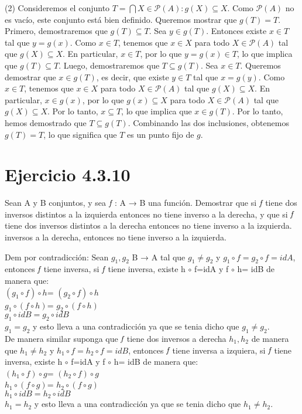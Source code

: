 \documentclass{report}
\begin{document}
        \noindent (2) Consideremos el conjunto $T = \bigcap {X \in \mathcal{P}(A) : g(X) \subseteq X}$. Como $\mathcal{P}(A)$ no es vacío, este conjunto está bien definido.
        Queremos mostrar que $g(T) = T$.
        Primero, demostraremos que $g(T) \subseteq T$. Sea $y \in g(T)$. Entonces existe $x \in T$ tal que $y = g(x)$.
        Como $x \in T$, tenemos que $x \in X$ para todo $X \in \mathcal{P}(A)$ tal que $g(X) \subseteq X$.
        En particular, $x \in T$, por lo que $y=g(x) \in T$, lo que implica que $g(T) \subseteq T$.
        Luego, demostraremos que $T \subseteq g(T)$. Sea $x \in T$. Queremos demostrar que $x \in g(T)$, es decir, que existe $y \in T$ tal que $x=g(y)$.
        Como $x \in T$, tenemos que $x \in X$ para todo $X \in \mathcal{P}(A)$ tal que $g(X) \subseteq X$.
        En particular, $x \in g({x})$, por lo que $g({x}) \subseteq X$ para todo $X \in \mathcal{P}(A)$ tal que $g(X) \subseteq X$.
        Por lo tanto, ${x} \subseteq T$, lo que implica que $x \in g(T)$.
        Por lo tanto, hemos demostrado que $T \subseteq g(T)$.
        Combinando las dos inclusiones, obtenemos $g(T) = T$, lo que significa que $T$ es un punto fijo de $g$.

    \section{Ejercicio 4.3.10}

    \noindent Sean A y B conjuntos, y sea $\emph{f}$ : A → B una función. Demostrar que si $\emph{f}$ 
    tiene dos inversos distintos a la izquierda entonces no tiene inverso a la derecha, y que si $\emph{f}$  tiene dos inversos distintos a la derecha entonces no tiene inverso a la izquierda.
    inversos a la derecha, entonces no tiene inverso a la izquierda.

    \noindent Dem por contradicción: Sean $g_1, g_2$ B → A tal que $g_1 \neq g_2$ y  $g_1 \circ f= g_2 \circ f=idA$, entonces $\emph{f}$ tiene inversa, si $\emph{f}$  tiene inversa, existe h $\circ$ f=idA y f $\circ$ h= idB de manera que:\\ $(g_1 \circ f) \circ h$= $(g_2 \circ f) \circ h$\\ $g_1 \circ (f \circ h)$= $g_2 \circ (f \circ h)$ \\ $g_1 \circ idB=g_2 \circ idB$\\ $g_1=g_2$ y esto lleva a una contradicción ya que se tenia dicho que $g_1 \neq g_2$. \\

    \noindent De manera similar suponga que $\emph{f}$  tiene dos inversos a derecha $h_1, h_2$ de manera que $h_1 \neq h_2$ y  $h_1 \circ f= h_2 \circ f=idB$, entonces $\emph{f}$ tiene inversa a izquiera, si $\emph{f}$  tiene inversa, existe h $\circ$ f=idA y f $\circ$ h= idB de manera que:\\ $(h_1 \circ f) \circ g$= $(h_2 \circ f) \circ g$\\ $h_1 \circ (f \circ g)$= $h_2 \circ (f \circ g)$ \\ $h_1 \circ idB=h_2 \circ idB$\\ $h_1=h_2$ y esto lleva a una contradicción ya que se tenia dicho que $h_1 \neq h_2$. \\
\end{document}
